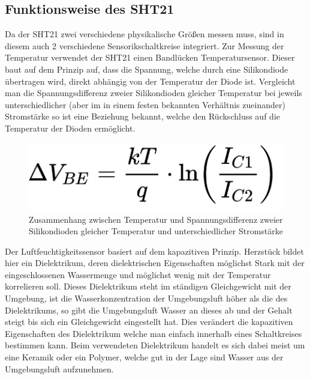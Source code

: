 \documentclass[]{article}
\begin{document}
		\subsection{Funktionsweise des SHT21}
		Da der SHT21 zwei verschiedene physikalische Größen messen muss, sind in diesem auch 2 verschiedene Sensorikschaltkreise integriert. Zur Messung der Temperatur verwendet der SHT21 einen Bandlücken Temperatursensor. Dieser baut auf dem Prinzip auf, dass die Spannung, welche durch eine Silikondiode übertragen wird, direkt abhängig von der Temperatur der Diode ist. Vergleicht man die Spannungsdifferenz zweier Silikondioden gleicher Temperatur bei jeweils unterschiedlicher (aber im in einem festen bekannten Verhältnis zueinander) Stromstärke so ist eine Beziehung bekannt, welche den Rückschluss auf die Temperatur der Dioden ermöglicht.
		\begin{figure}[!h]
			\centering
			\includegraphics[scale=0.2]{images/Temperatursensorformel}
			\caption{Zusammenhang zwischen Temperatur und Spannungsdifferenz zweier Silikondioden gleicher Temperatur und unterschiedlicher Stromstärke\cite{tempsensor}}
			\label{img:temperatursensor}
		\end{figure}
		
		Der Luftfeuchtigkeitssensor basiert auf dem kapazitiven Prinzip. Herzstück bildet hier ein Dielektrikum, deren dielektrischen Eigenschaften möglichst Stark mit der eingeschlossenen Wassermenge und möglichst wenig mit der Temperatur korrelieren soll. Dieses Dielektrikum steht im ständigen Gleichgewicht mit der Umgebung, ist die Wasserkonzentration der Umgebungsluft höher als die des Dielektrikums, so gibt die Umgebungsluft Wasser an dieses ab und der Gehalt steigt bis sich ein Gleichgewicht eingestellt hat. Dies verändert die kapazitiven Eigenschaften des Dielektrikum welche man einfach innerhalb eines Schaltkreises bestimmen kann. Beim verwendeten Dielektrikum handelt es sich dabei meist um eine Keramik oder ein Polymer, welche gut in der Lage sind Wasser aus der Umgebungsluft aufzunehmen. \cite{rhsensor}
		
\end{document}

